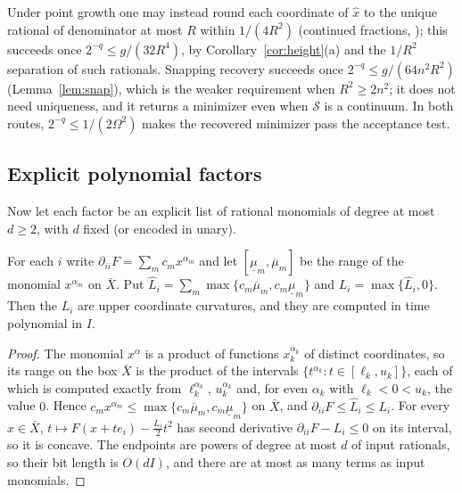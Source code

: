 \begin{remark}\label{rem:cf}
Under point growth one may instead round each coordinate of $\hat x$ to the
unique rational of denominator at most $R$ within $1/(4R^2)$ (continued
fractions, \cite[Theorem~5.1.9]{GrotschelLovaszSchrijver1988}); this succeeds
once $2^{-q}\le g/(32R^4)$, by Corollary~\ref{cor:height}(a) and the
$1/R^2$ separation of such rationals. Snapping recovery succeeds once
$2^{-q}\le g/(64n^2R^2)$ (Lemma~\ref{lem:snap}), which is the weaker
requirement when $R^2\ge2n^2$; it does not need uniqueness, and it returns a minimizer even
when $\mathcal S$ is a continuum. In both routes, $2^{-q}\le1/(2\Omega^2)$
makes the recovered minimizer pass the acceptance test.
\end{remark}



\subsection{Explicit polynomial factors}\label{sec:polynomial}

Now let each factor be an explicit list of rational monomials of degree at
most $d\ge2$, with $d$ fixed (or encoded in unary).

\begin{lemma}\label{lem:intcurv}
For each $i$ write $\partial_{ii}F=\sum_mc_mx^{\alpha_m}$ and let
$[\underline\mu_m,\overline\mu_m]$ be the range of the monomial $x^{\alpha_m}$
on $\bar X$. Put $\hat L_i=\sum_m\max\{c_m\overline\mu_m,
c_m\underline\mu_m\}$ and $L_i=\max\{\hat L_i,0\}$. Then the $L_i$ are
upper coordinate curvatures, and they are computed in time polynomial in $I$.
\end{lemma}

\begin{proof}
The monomial $x^{\alpha}$ is a product of functions $x_k^{\alpha_k}$ of
distinct coordinates, so its range on the box $\bar X$ is the product of the
intervals $\{t^{\alpha_k}:t\in[\ell_k,u_k]\}$, each of which is computed
exactly from $\ell_k^{\alpha_k}$, $u_k^{\alpha_k}$ and, for even $\alpha_k$
with $\ell_k<0<u_k$, the value $0$. Hence
$c_mx^{\alpha_m}\le\max\{c_m\overline\mu_m,c_m\underline\mu_m\}$
on $\bar X$, and $\partial_{ii}F\le\hat L_i\le L_i$. For every $x\in\bar X$,
$t\mapsto F(x+te_i)-\frac{L_i}2t^2$ has second derivative
$\partial_{ii}F-L_i\le0$ on its interval, so it is concave. The endpoints are
powers of degree at most $d$ of input rationals, so their bit length is
$O(dI)$, and there are at most as many terms as input monomials.
\end{proof}

